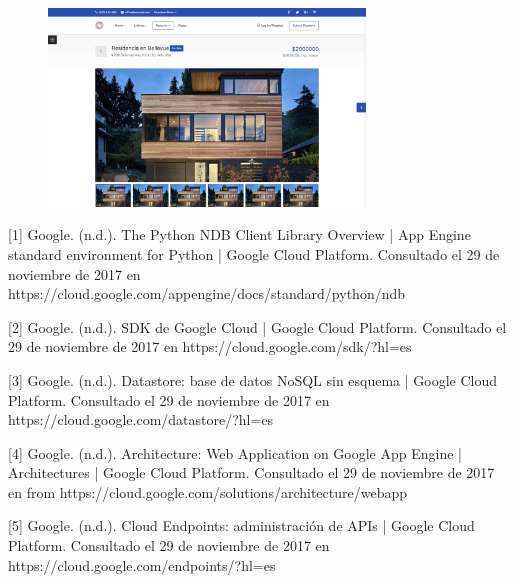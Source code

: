 \documentclass[12pt]{article}
\begin{document}
\begin{figure}[H]
\centering
\includegraphics[width=0.75\textwidth]{img4.jpg}
\caption{}
\end{figure} 




[1] Google. (n.d.). The Python NDB Client Library Overview  |  App Engine standard environment for Python  |  Google Cloud Platform. Consultado el 29 de noviembre de 2017 en https://cloud.google.com/appengine/docs/standard/python/ndb \linebreak

[2] Google. (n.d.). SDK de Google Cloud  |  Google Cloud Platform. Consultado el 29 de noviembre de 2017 en  https://cloud.google.com/sdk/?hl=es \linebreak

[3] Google. (n.d.). Datastore: base de datos NoSQL sin esquema  |  Google Cloud Platform. Consultado el 29 de noviembre de 2017 en https://cloud.google.com/datastore/?hl=es \linebreak


[4] Google. (n.d.). Architecture: Web Application on Google App Engine  |  Architectures  |  Google Cloud Platform. Consultado el 29 de noviembre de 2017 en  from https://cloud.google.com/solutions/architecture/webapp \linebreak

[5] Google. (n.d.). Cloud Endpoints: administración de APIs  |  Google Cloud Platform. Consultado el 29 de noviembre de 2017 en https://cloud.google.com/endpoints/?hl=es \linebreak
\end{document}
